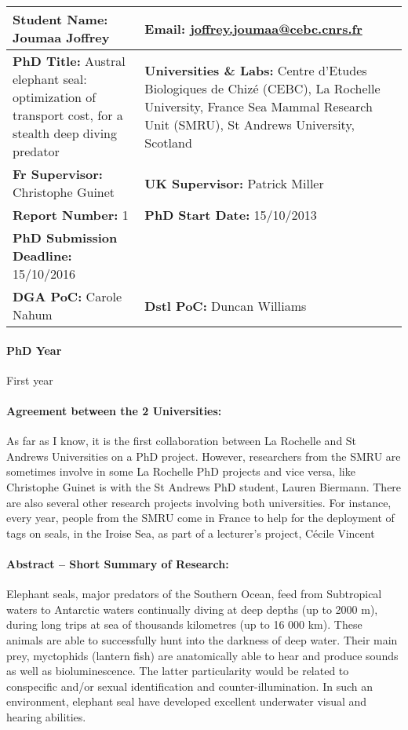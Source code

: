 \documentclass[12pt,a4paper]{report}
\begin{document}
\begin{center}
    \begin{tabular}{M{8cm}|M{8cm}}
    \toprule
    \textbf{Student Name:} Joumaa Joffrey & \textbf{Email:} \href{mailto:joffrey.joumaa@cebc.cnrs.fr}{joffrey.joumaa@cebc.cnrs.fr}  \tabularnewline \midrule
    \textbf{PhD Title:} Austral elephant seal: optimization of transport cost, for a stealth deep diving predator & \textbf{Universities \& Labs:} Centre d’Etudes Biologiques de Chizé (CEBC), La Rochelle University, France  Sea Mammal Research Unit (SMRU), St Andrews University, Scotland \tabularnewline \midrule
    \textbf{Fr Supervisor:} Christophe Guinet & \textbf{UK Supervisor:} Patrick Miller \tabularnewline \midrule
    \textbf{Report Number:} 1 & \textbf{PhD Start Date:} 15/10/2013  \\
    \textbf{PhD Submission Deadline:} 15/10/2016 \tabularnewline \midrule
    \textbf{DGA PoC:} Carole Nahum & \textbf{Dstl PoC:} Duncan Williams \tabularnewline \bottomrule
    \end{tabular}
\end{center}
\paragraph{PhD Year}
First year

\paragraph{Agreement between the 2 Universities:} 
As far as I know, it is the first collaboration between La Rochelle and St Andrews Universities on a PhD project. However, researchers from the SMRU are sometimes involve in some La Rochelle PhD projects and vice versa, like Christophe Guinet is with the St Andrews PhD student, Lauren Biermann. There are also several other research projects involving both universities. For instance, every year, people from the SMRU come in France to help for the deployment of tags on seals, in the Iroise Sea, as part of a lecturer’s project, Cécile Vincent 

\paragraph{Abstract -- Short Summary of Research:}
Elephant seals, major predators of the Southern Ocean, feed from Subtropical waters to Antarctic waters continually diving at deep depths (up to 2000 m), during long trips at sea of thousands kilometres (up to 16 000 km). These animals are able to successfully hunt into the darkness of deep water. Their main prey, myctophids (lantern fish) are anatomically able to hear and produce sounds as well as bioluminescence. The latter particularity would be related to conspecific and/or sexual identification and counter-illumination. In such an environment, elephant seal have developed excellent underwater visual and hearing abilities.
\end{document}

